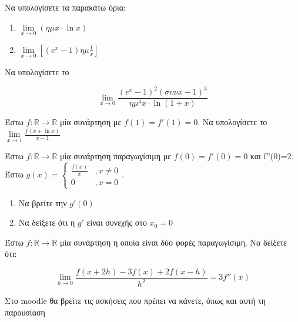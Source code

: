 \documentclass{presentation}
\begin{document}
\begin{askisi}
  Να υπολογίσετε τα παρακάτω όρια:
  \begin{enumerate}[<+->]
    \item $\lim\limits_{x \to 0}{ \left( ημx\cdot \ln x \right)  }$
    \item $\lim\limits_{x \to 0}{ \left[ (e^x-1)ημ\frac{1}{x} \right]  }$
  \end{enumerate}
\end{askisi}

\begin{askisi}
  Να υπολογίσετε το

  $$\lim\limits_{x \to 0}{ \frac{(e^x-1)^2(συνx-1)^3}{ημ^4x\cdot \ln (1+x)}  }$$
\end{askisi}

\begin{askisi}
  Έστω $f:\mathbb{R}\to\mathbb{R}$ μία συνάρτηση με $f(1)=f'(1)=0$. Να υπολογίσετε το $\lim\limits_{x \to 1}{ \frac{f(x+\ln x)}{x-1}}$
\end{askisi}

\begin{askisi}
  Έστω $f:\mathbb{R}\to\mathbb{R}$ μία συνάρτηση παραγωγίσιμη με $f(0)=f'(0)=0$ και f''(0)=2. Έστω $g(x)=\begin{cases}\frac{f(x)}{x} & ,x\ne 0 \\
             0              & ,x=0\end{cases}$.

  \begin{enumerate}[<+->]
    \item Να βρείτε την $g'(0)$
    \item Να δείξετε ότι η $g'$ είναι συνεχής στο $x_0=0$
  \end{enumerate}
\end{askisi}

\begin{askisi}
  Έστω $f:\mathbb{R}\to\mathbb{R}$ μία συνάρτηση η οποία είναι δύο φορές παραγωγίσιμη. Να δείξετε ότι:

  $$\lim\limits_{h \to 0}{ \frac{f(x+2h)-3f(x)+2f(x-h)}{h^2} }=3f''(x)$$
\end{askisi}

\begin{frame}
  Στο moodle θα βρείτε τις ασκήσεις που πρέπει να κάνετε, όπως και αυτή τη παρουσίαση
\end{frame}
\end{document}
